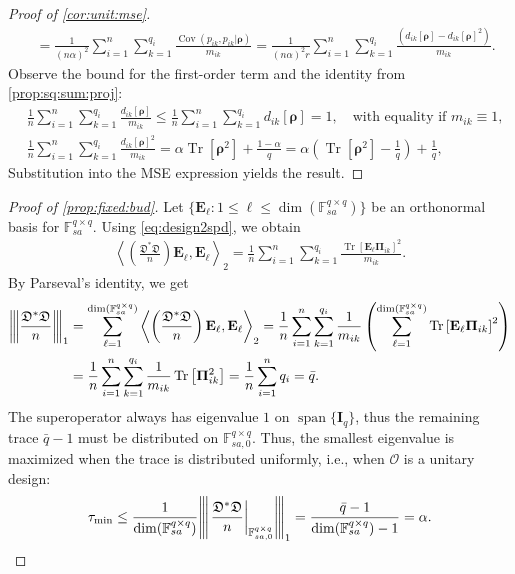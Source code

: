 \documentclass[noinfoline]{imsart}\setcounter{tocdepth}{2}
\renewcommand{\b}[1]{\mathbb{#1}} %
\newcommand{\m}[1]{\mathbf{#1}} %
\newcommand{\f}[1]{\mathfrak{#1}} %
\renewcommand{\c}[1]{\mathcal{#1}} %
\newcommand{\mb}[1]{\boldsymbol{#1}} %
\newcommand{\tr}[1]{\operatorname{Tr}\left[#1\right]}
\newcommand{\vertiii}[1]{{\left\vert\kern-0.25ex\left\vert\kern-0.25ex\left\vert #1 
    \right\vert\kern-0.25ex\right\vert\kern-0.25ex\right\vert}} %
\newcommand{\innpr}[2]{{\left\langle {#1},{#2}\right\rangle}} %
\newcommand{\Cov}{\operatorname{Cov}}
\DeclareMathOperator*{\spann}{span}
\theoremstyle{plain}
\begin{document}
\begin{appendix}
\begin{proof}[Proof of \cref{cor:unit:mse}]
\begin{align*}
    &= \frac{1}{(n \alpha)^{2}} \sum_{i=1}^{n} \sum_{k=1}^{q_{i}} \frac{\Cov (p_{ik}, p_{ik} \vert \mb{\rho})}{m_{ik}} 
    = \frac{1}{(n \alpha)^{2} r} \sum_{i=1}^{n} \sum_{k=1}^{q_{i}} \frac{(d_{ik}[\mb{\rho}] - d_{ik}[\mb{\rho}]^{2})}{m_{ik}}.
\end{align*}
Observe the bound for the first-order term and the identity from \cref{prop:sq:sum:proj}:
\begin{align*}
    &\frac{1}{n} \sum_{i=1}^{n} \sum_{k=1}^{q_{i}} \frac{d_{ik}[\mb{\rho}]}{m_{ik}} \le \frac{1}{n} \sum_{i=1}^{n} \sum_{k=1}^{q_{i}} d_{ik}[\mb{\rho}] = 1, \quad \text{with equality if } m_{ik} \equiv 1, \\
    &\frac{1}{n} \sum_{i=1}^{n} \sum_{k=1}^{q_{i}} \frac{d_{ik}[\mb{\rho}]^{2}}{m_{ik}} = \alpha \tr{\mb{\rho}^{2}} + \frac{1-\alpha}{q} = \alpha \left(\tr{\mb{\rho}^{2}} - \frac{1}{q} \right) + \frac{1}{q},
\end{align*}
Substitution into the MSE expression yields the result. 
\end{proof}


\begin{proof}[Proof of \cref{prop:fixed:bud}]
Let $\{\m{E}_{\ell} : 1 \le \ell \le \dim(\b{F}_{sa}^{q \times q})\}$ be an orthonormal basis for $\b{F}_{sa}^{q \times q}$. Using \eqref{eq:design2spd}, we obtain
\begin{align*}
    \innpr{\left(\frac{\f{D}^{*} \f{D}}{n}\right) \m{E}_{\ell}}{\m{E}_{\ell}}_{2} = \frac{1}{n} \sum_{i=1}^{n} \sum_{k=1}^{q_{i}} \frac{\tr{\m{E}_{\ell} \m{\Pi}_{ik}}^{2}}{m_{ik}}.
\end{align*}
By Parseval's identity, we get
\begin{align*}
    \vertiii{\frac{\f{D}^{*} \f{D}}{n}}_{1} &= 
    \sum_{\ell=1}^{\dim(\b{F}_{sa}^{q \times q})}
    \innpr{\left(\frac{\f{D}^{*} \f{D}}{n}\right) \m{E}_{\ell}}{\m{E}_{\ell}}_{2} = \frac{1}{n} \sum_{i=1}^{n} \sum_{k=1}^{q_{i}} \frac{1}{m_{ik}} \left( \sum_{\ell=1}^{\dim(\b{F}_{sa}^{q \times q})} \tr{\m{E}_{\ell} \m{\Pi}_{ik}}^{2}\right) \\
    &= \frac{1}{n} \sum_{i=1}^{n} \sum_{k=1}^{q_{i}} \frac{1}{m_{ik}} \tr{\m{\Pi}_{ik}^{2}} = \frac{1}{n} \sum_{i=1}^{n} q_i = \bar{q}.
\end{align*}
The superoperator always has eigenvalue $1$ on $\spann\{\m{I}_{q}\}$, thus the remaining trace $\bar{q}-1$ must be distributed on $\b{F}_{sa, 0}^{q \times q}$. Thus, the smallest eigenvalue is maximized when the trace is distributed uniformly, i.e., when $\c{O}$ is a unitary design:
\begin{align*}
    \tau_{\min} \le \frac{1}{\dim(\b{F}_{sa}^{q \times q})} \vertiii{\left. \frac{\f{D}^{*} \f{D}}{n} \right\vert_{\b{F}_{sa, 0}^{q \times q}} }_{1} = \frac{\bar{q} - 1}{\dim(\b{F}_{sa}^{q \times q}) -1} = \alpha.
\end{align*}
\end{proof}



\end{appendix}
\end{document}

